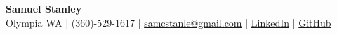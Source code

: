 \documentclass[10pt]{article}
\begin{document}
  \begin{center}
    {\fontsize{20}{16}\selectfont \textbf{Samuel Stanley}}\\
    Olympia WA \quad | \quad (360)-529-1617 \quad | \quad
    \href{mailto:samcstanle@gmail.com}{samcstanle@gmail.com} \quad | \quad
    \href{https://www.linkedin.com/in/samuel-stanley-1ba48b24a/}{LinkedIn} \quad | \quad
    \href{https://github.com/SamStan4}{GitHub}
  \end{center}
\end{document}
